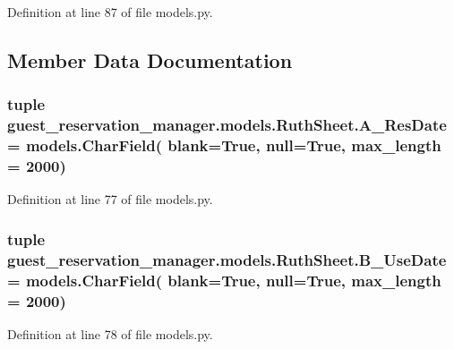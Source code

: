 Definition at line 87 of file models.\-py.



\subsection{Member Data Documentation}
\hypertarget{classguest__reservation__manager_1_1models_1_1RuthSheet_a7a1b41e8b3f8694520a49775c9d33cbb}{
\subsubsection[{A\-\_\-\-Res\-Date}]{\setlength{\rightskip}{0pt plus 5cm}tuple guest\-\_\-reservation\-\_\-manager.\-models.\-Ruth\-Sheet.\-A\-\_\-\-Res\-Date = models.\-Char\-Field( blank=True, null=True, max\-\_\-length = 2000)\hspace{0.3cm}{\ttfamily [static]}}}\label{classguest__reservation__manager_1_1models_1_1RuthSheet_a7a1b41e8b3f8694520a49775c9d33cbb}


Definition at line 77 of file models.\-py.

\hypertarget{classguest__reservation__manager_1_1models_1_1RuthSheet_a63241ce746b320b58e2831465f4c5271}{
\subsubsection[{B\-\_\-\-Use\-Date}]{\setlength{\rightskip}{0pt plus 5cm}tuple guest\-\_\-reservation\-\_\-manager.\-models.\-Ruth\-Sheet.\-B\-\_\-\-Use\-Date = models.\-Char\-Field( blank=True, null=True, max\-\_\-length = 2000)\hspace{0.3cm}{\ttfamily [static]}}}\label{classguest__reservation__manager_1_1models_1_1RuthSheet_a63241ce746b320b58e2831465f4c5271}


Definition at line 78 of file models.\-py.

